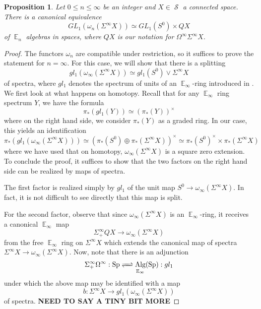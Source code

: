 \documentclass[reqno, oneside]{amsart}
\theoremstyle{definition}
\theoremstyle{plain}
\newtheorem{prop}[nul]{Proposition}
\DeclareMathOperator{\E}{\mathbb{E}}
\DeclareMathOperator{\cS}{\mathcal{S}}
\DeclareMathOperator{\Alg}{\text{Alg}}
\DeclareMathOperator{\Sp}{\text{Sp}}
\begin{document}
\begin{prop}\label{prop:sq0units}
Let $0\leq n\leq \infty$ be an integer and $X\in \cS$ a connected space.  
 There is a canonical equivalence $$GL_1(\omega_n (\Sigma^{\infty} X)) \simeq GL_1(S^0) \times QX$$ of $\E_n$ algebras in spaces, where $QX$ is our notation for $\Omega^{\infty}\Sigma^\infty X$.  
\end{prop}
\begin{proof}
The functors $\omega_n$ are compatible under restriction, so it suffices to prove the statement for $n=\infty.$  For this case, we will show that there is a splitting $$gl_1(\omega_\infty(\Sigma^{\infty}X)) \simeq gl_1(S^0) \vee \Sigma^\infty X$$ of spectra, where $gl_1$ denotes the spectrum of units of an $\E_\infty$-ring introduced in \cite{MQRT}.  We first look at what happens on homotopy.  Recall that for any $\E_\infty$ ring spectrum $Y$, we have the formula $$\pi_*(gl_1(Y)) \simeq (\pi_*(Y))^\times$$ where on the right hand side, we consider $\pi_*(Y)$ as a graded ring.  In our case, this yields an identification $$\pi_*(gl_1(\omega_\infty (\Sigma^{\infty}X))) \simeq (\pi_*(S^0) \oplus \pi_*(\Sigma^{\infty}X))^\times \simeq \pi_*(S^0)^{\times} \times \pi_*(\Sigma^\infty X)$$
where we have used that on homotopy, $\omega_\infty (\Sigma^\infty X)$ is a square zero extension.  To conclude the proof, it suffices to show that the two factors on the right hand side can be realized by maps of spectra.  

The first factor is realized simply by $gl_1$ of the unit map $S^0 \to \omega_\infty (\Sigma^\infty X).$  In fact, it is not difficult to see directly that this map is split.  

For the second factor, observe that since $\omega_\infty (\Sigma^\infty X)$ is an $\E_\infty$-ring, it receives a canonical $\E_\infty$ map $$\Sigma^{\infty}_+ QX \longrightarrow \omega_\infty (\Sigma^\infty X)$$ from the free $\E_\infty$ ring on $\Sigma^\infty X$ which extends the canonical map of spectra $\Sigma^\infty X \to \omega_\infty (\Sigma^\infty X).$  Now, note that there is an adjunction \cite{MQRT} $$\Sigma^{\infty}_+\Omega^\infty : \Sp \xrightleftharpoons{\quad} \Alg_{\E_\infty}(\Sp) : gl_1$$ under which the above map may be identified with a map $$b: \Sigma^\infty X \to gl_1 (\omega_\infty (\Sigma^{\infty} X))$$ of spectra.  \textbf{NEED TO SAY A TINY BIT MORE}



\end{proof}
\end{document}
